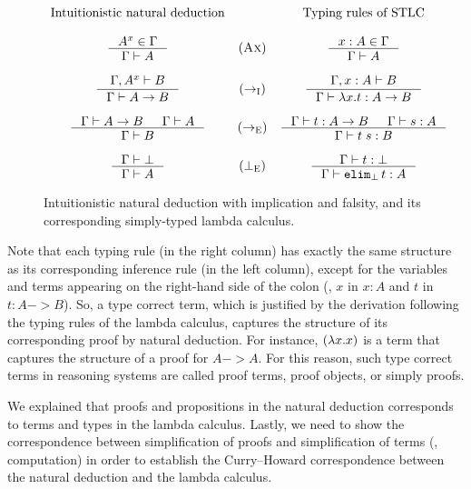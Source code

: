\begin{figure}
\[
\begin{array}{ccc}
	\text{Intuitionistic natural deduction} & &
	\text{Typing rules of STLC} \\ \\
\inference{A^x \in \Gamma}{\Gamma |- A} & (\textsc{Ax}) &
\inference{x:A \in \Gamma}{\Gamma |- A} \\ \\
\inference{\Gamma,A^x |- B}{\Gamma |- A -> B} & (->_\textsc{I}) &
\inference{\Gamma,x:A |- B}{\Gamma |- \l x.t : A -> B} \\ \\
\inference{\Gamma |- A -> B & \Gamma |- A}{\Gamma |- B} & (->_\textsc{E}) &
\inference{\Gamma |- t : A -> B & \Gamma |- s : A}{\Gamma |- t\;s : B} \\ \\
\inference{\Gamma |- \bot}{\Gamma |- A} & (\bot_\textsc{E})  &
\inference{\Gamma |- t:\bot}{\Gamma |- \texttt{elim}_\bot\,t : A}
\end{array}
\]
\caption{Intuitionistic natural deduction with implication and falsity,
	and its corresponding simply-typed lambda calculus.}
\label{fig:nd}
\end{figure}

Note that each typing rule (in the right column) has exactly the same structure
as its corresponding inference rule (in the left column), except for
the variables and terms appearing on the right-hand side of the colon
(\eg, $x$ in $x:A$ and $t$ in $t:A -> B$). So, a type correct term,
which is justified by the derivation following the typing rules of
the lambda calculus, captures the structure of its corresponding proof
by natural deduction. For instance, $(\lambda x. x)$ is a term that captures
the structure of a proof for $A -> A$.
For this reason, such type correct terms in reasoning systems
are called proof terms, proof objects, or simply proofs.

We explained that proofs and propositions in the natural deduction
corresponds to terms and types in the lambda calculus. Lastly,
we need to show the correspondence between simplification of proofs
and simplification of terms (\ie, computation) in order to establish
the Curry--Howard correspondence between the natural deduction
and the lambda calculus.

